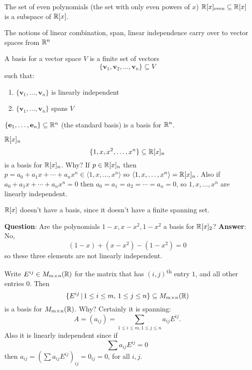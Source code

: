 \documentclass[10pt, a4paper]{article}
\newcommand{\mbf}[1]{\mathbf{#1}}
\newcommand{\ts}[1]{\textsuperscript{#1}}
\begin{document}
\begin{example}
    The set of even polynomials
    (the set with only even powers of $x$)
    $\mathbb{R}[x]_{\text{even}} \subseteq \mathbb{R}[x]$
    is a subspace of $\mathbb{R}[x]$.
\end{example}



The notions of linear combination, span,
linear independence carry over to vector spaces from $\mathbb{R} ^ n$

\begin{definition}[Basis]
    A basis for a vector space $V$ is a finite set of vectors
    \[
    \{\mbf{v}_1, \mbf{v}_2, \dotsc, \mbf{v}_n\} \subseteq V
    \]
    such that:
    \begin{enumerate}[label = (\roman*)]
        \item $\{\mbf{v}_1, \dotsc, \mbf{v}_n\}$ is linearly independent
        \item $\{\mbf{v}_1, \dotsc, \mbf{v}_n\}$ spans $V$
    \end{enumerate}
\end{definition}


\begin{example}
    $\{\mbf{e}_1, \dotsc, \mbf{e}_n\} \subseteq \R ^ n$
    (the standard basis)
    is a basis for $\mathbb{R} ^ n$.
\end{example}
\begin{example}
    $\mathbb{R}[x]_n$
    \[
    \{1, x, x ^ 2, \dotsc, x ^ n\} \subseteq \mathbb{R}[x]_n
    \]
    is a basis for $\mathbb{R}[x]_n$.
    Why?
    If $p \in \mathbb{R}[x]_n$ then
    $p = a_0 + a_1x + \dotsi + a_nx ^ n \in \langle 1, x, \dotsc, x ^ n\rangle$
    so $\langle 1, x, \dotsc, x ^ n\rangle = \mathbb{R}[x]_n$.
    Also if $a_0 + a_1x + \dotsi + a_nx ^ n = 0$ then $a_0 = a_1 = a_2 = \dotsi = a_n = 0$,
    so $1, x, \dotsc, x ^ n$ are linearly independent.
\end{example}

$\mathbb{R}[x]$ doesn't have a basis,
since it doesn't have a finite spanning set.

\textbf{Question}:
Are the polynomials $1 - x, x - x ^ 2, 1 - x ^ 2$ a basis for $\mathbb{R}[x]_2$?
\textbf{Answer}:
No,
\[
(1 - x) + (x - x ^ 2) - (1 - x ^ 2) = 0
\]
so these three elements are not linearly independent.

\begin{example}
    Write $E^{ij} \in M_{m \times n}(\mathbb{R})$ for the matrix that has $(i, j)$\ts{th} entry $1$,
    and all other entries $0$.
    Then
    \[
    \{E ^ {ij}\,|\, 1 \leq i \leq m,\, 1 \leq j \leq n\} \subseteq M_{m \times n}(\mathbb{R})
    \]
    is a basis for $M_{m \times n}(\mathbb{R})$.
    Why?
    Certainly it is spanning:
    \[
    A = (a_{ij}) = \sum_{1 \leq i \leq m, 1 \leq j \leq n}a_{ij}E ^ {ij}.
    \]
    Also it is linearly independent since if
    \[
    \sum a_{ij}E^{ij} = 0
    \]
    then $a_{ij} = \left(\sum a_{ij}E^{ij}\right)_{ij} = 0_{ij} = 0$,
    for all $i, j$.
\end{example}
\end{document}
